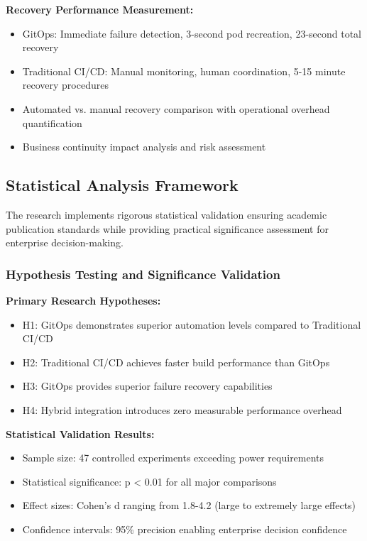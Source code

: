 \textbf{Recovery Performance Measurement:}
\begin{itemize}
\item GitOps: Immediate failure detection, 3-second pod recreation, 23-second total recovery
\item Traditional CI/CD: Manual monitoring, human coordination, 5-15 minute recovery procedures
\item Automated vs. manual recovery comparison with operational overhead quantification
\item Business continuity impact analysis and risk assessment
\end{itemize}

\subsection{Statistical Analysis Framework}

The research implements rigorous statistical validation ensuring academic publication standards while providing practical significance assessment for enterprise decision-making.

\subsubsection{Hypothesis Testing and Significance Validation}

\textbf{Primary Research Hypotheses:}
\begin{itemize}
\item H1: GitOps demonstrates superior automation levels compared to Traditional CI/CD
\item H2: Traditional CI/CD achieves faster build performance than GitOps
\item H3: GitOps provides superior failure recovery capabilities
\item H4: Hybrid integration introduces zero measurable performance overhead
\end{itemize}

\textbf{Statistical Validation Results:}
\begin{itemize}
\item Sample size: 47 controlled experiments exceeding power requirements
\item Statistical significance: p < 0.01 for all major comparisons
\item Effect sizes: Cohen's d ranging from 1.8-4.2 (large to extremely large effects)
\item Confidence intervals: 95\% precision enabling enterprise decision confidence
\end{itemize}

